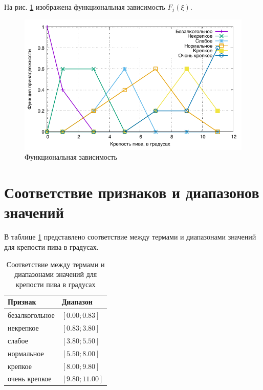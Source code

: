\newpage

На рис. \ref{img:1} изображена функциональная зависимость $F_j(\xi)$.

\begin{figure}[h!]
\centering
    \includegraphics[width=0.8\linewidth]{../data/beer.pdf}
    \caption{Функциональная зависимость}
    \label{img:1}	
\end{figure}

\section{Соответствие признаков и диапазонов значений}
В таблице \ref{tbl:5} представлено соответствие между термами и диапазонами значений для крепости пива в градусах.

\begin{table}[H]
	\begin{center}
	\caption{Соответствие между термами и диапазонами значений для крепости пива в градусах}
	\label{tbl:5}
	\begin{tabular}{|l|l|}
		\hline
		Признак            & Диапазон \\ \hline
		безалкогольное          &  $\left[0.00;0.83\right]$        \\ \hline
		некрепкое    &       $\left[0.83;3.80\right]$    \\ \hline
		слабое    &     $\left[3.80;5.50\right]$      \\ \hline
		нормальное             &    $\left[5.50;8.00\right]$     \\ \hline
		крепкое       &        $\left[8.00;9.80\right]$   \\ \hline
		очень крепкое &    $\left[9.80;11.00\right]$       \\ \hline
	\end{tabular}
	\end{center}
\end{table}



\newpage